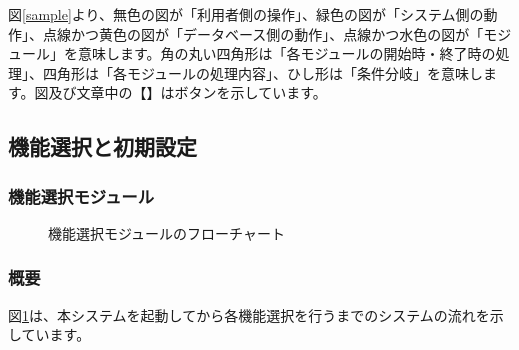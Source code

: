 \documentclass[a4j]{jarticle}
\begin{document}
図\ref{sample}より、無色の図が「利用者側の操作」、緑色の図が「システム側の動作」、点線かつ黄色の図が「データベース側の動作」、点線かつ水色の図が「モジュール」を意味します。角の丸い四角形は「各モジュールの開始時・終了時の処理」、四角形は「各モジュールの処理内容」、ひし形は「条件分岐」を意味します。図及び文章中の【】はボタンを示しています。

\subsection{機能選択と初期設定}
\subsubsection{機能選択モジュール\label{機能選択}}
\begin{figure}[H]
    \begin{center}
    \caption {機能選択モジュールのフローチャート}
    \label{functionselection}
    \end{center}
\end{figure}

\subsubsection*{概要}
図\ref{functionselection}は、本システムを起動してから各機能選択を行うまでのシステムの流れを示しています。
\end{document}
